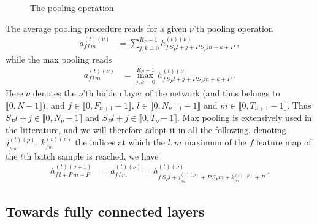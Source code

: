 \begin{figure}[H]
\begin{center}
\caption{The pooling operation}
\end{center}
\end{figure}

The average pooling procedure reads for a given $\nu$'th pooling operation
\begin{align}
a_{f\,l\,m}^{(t)(\nu)}&=\sum^{R_P-1}_{j,k=0} h_{f\,S_P l+j+P\,S_Pm+k+P}^{(t)(\nu)}\;,
\end{align}
while the max pooling reads
\begin{align}
a_{f\,l\,m}^{(t)(\nu)}&=\max^{R_P-1}_{j,k=0} h_{f\,S_P l+j+P\,S_Pm+k+P}^{(t)(\nu)}\;.
\end{align}
Here $\nu$ denotes the $\nu$'th hidden layer of the network (and thus belongs to $\llbracket0,N-1 \rrbracket$), and $f\in\llbracket0,F_{\nu+1}-1\rrbracket$, $l\in\llbracket0,N_{\nu+1}-1 \rrbracket$ and $m\in\llbracket0,T_{\nu+1}-1 \rrbracket$. Thus $S_Pl+j\in\llbracket0,N_\nu-1 \rrbracket$ and $S_Pl+j\in\llbracket0,T_\nu-1 \rrbracket$. Max pooling is extensively used in the litterature, and we will therefore adopt it in all the following. denoting $j^{(t)(p)}_{_{flm}},\,k^{(t)(p)}_{_{flm}}$ the indices at which the $l,m$ maximum  of the $f$ feature map of the $t$th batch sample is reached, we have
\begin{align}
h_{f\,l+P\,m+P}^{(t)(\nu+1)}&=a_{f\,l\,m}^{(t)(\nu)}=
%
h^{(t)(\nu)}_{f\,S_P l+j^{(t)(p)}_{_{flm}}+P\,S_Pm+k^{(t)(p)}_{_{flm}}+P}\;.
\end{align}

\subsection{Towards fully connected layers}

